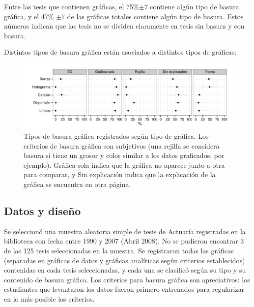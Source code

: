 \documentclass{tufte-handout}\usepackage{graphicx, color}
\begin{document}
Entre las tesis que contienen gráficas, el 75\%$\pm7$ contiene algún tipo
de basura gráfica, y el 47\% $\pm 7$ de las gráficas totales contiene algún
tipo de basura. Estos números indican que las tesis no se dividen claramente
en tesis sin basura y con basura.


Distintos tipos de basura gráfica están asociados a distintos tipos de gráficas:




\begin{figure}
\centering
\caption{Tipos de basura gráfica registrados según tipo de gráfica. Los criterios
de basura gráfica son subjetivos (una rejilla se considera basura
si tiene un grosor y color similar a los datos graficados, por ejemplo). Gráfica sola indica que la gráfica no aparece junto a otra para comparar, y Sin explicación indica que la explicación de la gráfica se encuentra en otra página.}
\includegraphics{./figure/grafbasura.pdf}
\end{figure}







\subsection{Datos y diseño}

Se seleccionó una muestra aleatoria simple de tesis de Actuaría registradas
en la biblioteca con fecha entre 1990 y 2007 (Abril 2008). No se pudieron encontrar
3 de las 125 tesis seleccionadas en la muestra. Se registraron todas
las gráficas (separadas en gráficas de datos y gráficas analíticas según
criterios establecidos) contenidas en cada tesis seleccionadas, y cada
una se clasificó según su tipo y su contenido de basura gráfica. Los criterios
para basura gráfica son apreciativos: los estudiantes que levantaron los datos
fueron primero entrenados para regularizar en lo más posible los criterios.
\end{document}
